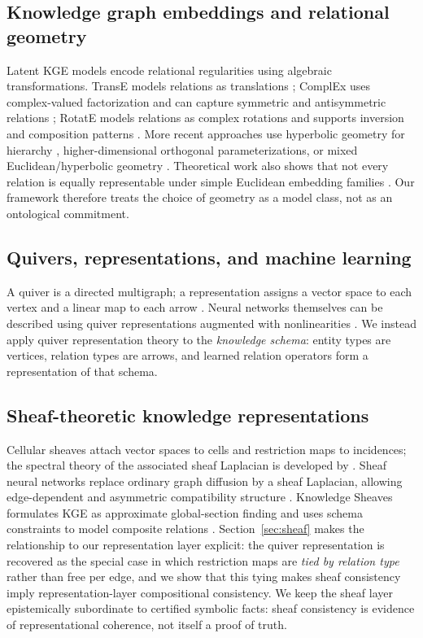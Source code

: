 \documentclass[11pt]{article}
\begin{document}
\subsection{Knowledge graph embeddings and relational geometry}
Latent KGE models encode relational regularities using algebraic transformations. TransE models relations as translations \citep{bordes2013}; ComplEx uses complex-valued factorization and can capture symmetric and antisymmetric relations \citep{trouillon2016}; RotatE models relations as complex rotations and supports inversion and composition patterns \citep{sun2019}. More recent approaches use hyperbolic geometry for hierarchy \citep{chami2020}, higher-dimensional orthogonal parameterizations, or mixed Euclidean/hyperbolic geometry \citep{li2024golde,yusupov2025}. Theoretical work also shows that not every relation is equally representable under simple Euclidean embedding families \citep{bhattacharjee2020}. Our framework therefore treats the choice of geometry as a model class, not as an ontological commitment.

\subsection{Quivers, representations, and machine learning}
A quiver is a directed multigraph; a representation assigns a vector space to each vertex and a linear map to each arrow \citep{derksen2017,schiffler2014}. Neural networks themselves can be described using quiver representations augmented with nonlinearities \citep{armenta2020,ganev2022}. We instead apply quiver representation theory to the \emph{knowledge schema}: entity types are vertices, relation types are arrows, and learned relation operators form a representation of that schema.

\subsection{Sheaf-theoretic knowledge representations}
Cellular sheaves attach vector spaces to cells and restriction maps to incidences; the spectral theory of the associated sheaf Laplacian is developed by \citet{hansen2019spectral}. Sheaf neural networks replace ordinary graph diffusion by a sheaf Laplacian, allowing edge-dependent and asymmetric compatibility structure \citep{hansen2020,bodnar2022,braithwaite2024}. Knowledge Sheaves formulates KGE as approximate global-section finding and uses schema constraints to model composite relations \citep{gebhart2023}. Section~\ref{sec:sheaf} makes the relationship to our representation layer explicit: the quiver representation is recovered as the special case in which restriction maps are \emph{tied by relation type} rather than free per edge, and we show that this tying makes sheaf consistency imply representation-layer compositional consistency. We keep the sheaf layer epistemically subordinate to certified symbolic facts: sheaf consistency is evidence of representational coherence, not itself a proof of truth.
\end{document}
